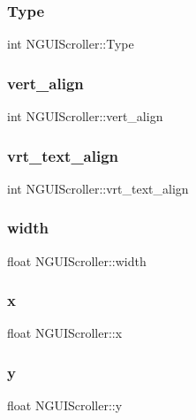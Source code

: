 \subsubsection{\texorpdfstring{Type}{Type}}
{\footnotesize\ttfamily int N\+G\+U\+I\+Scroller\+::\+Type}

\hypertarget{class_n_g_u_i_scroller_a31c46a1defdce4b8c825c7a3309782f8}{}\label{class_n_g_u_i_scroller_a31c46a1defdce4b8c825c7a3309782f8} 
\subsubsection{\texorpdfstring{vert\+\_\+align}{vert\_align}}
{\footnotesize\ttfamily int N\+G\+U\+I\+Scroller\+::vert\+\_\+align}

\hypertarget{class_n_g_u_i_scroller_a584acb189e9b362eeb5b6e2e6a3b0ff2}{}\label{class_n_g_u_i_scroller_a584acb189e9b362eeb5b6e2e6a3b0ff2} 
\subsubsection{\texorpdfstring{vrt\+\_\+text\+\_\+align}{vrt\_text\_align}}
{\footnotesize\ttfamily int N\+G\+U\+I\+Scroller\+::vrt\+\_\+text\+\_\+align}

\hypertarget{class_n_g_u_i_scroller_af8bed908812bd42599c765d3f41f6bbf}{}\label{class_n_g_u_i_scroller_af8bed908812bd42599c765d3f41f6bbf} 
\subsubsection{\texorpdfstring{width}{width}}
{\footnotesize\ttfamily float N\+G\+U\+I\+Scroller\+::width}

\hypertarget{class_n_g_u_i_scroller_a575249b84dfc88a2949c7c14e9a39cc7}{}\label{class_n_g_u_i_scroller_a575249b84dfc88a2949c7c14e9a39cc7} 
\subsubsection{\texorpdfstring{x}{x}}
{\footnotesize\ttfamily float N\+G\+U\+I\+Scroller\+::x}

\hypertarget{class_n_g_u_i_scroller_a232fafd46368d6cfab21cbdf8abe0161}{}\label{class_n_g_u_i_scroller_a232fafd46368d6cfab21cbdf8abe0161} 
\subsubsection{\texorpdfstring{y}{y}}
{\footnotesize\ttfamily float N\+G\+U\+I\+Scroller\+::y}

